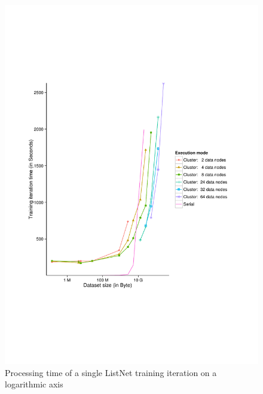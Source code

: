 \begin{figure}
\centering
\includegraphics[trim=0cm 5cm 0cm 5cm, scale=0.7]{gfx/time_single_logx.pdf}
\caption{Processing time of a single ListNet training iteration on a logarithmic axis}
\label{fig:listnet_train_time_log}
\end{figure}

